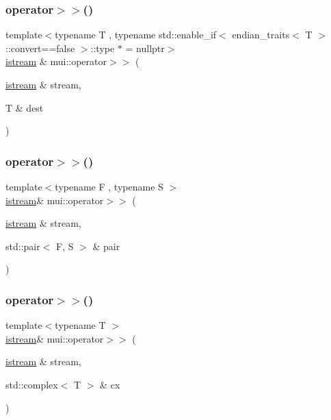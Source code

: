 \mbox{\label{namespacemui_a3b115b75378c546838f2622c86ebb53c}} 
\subsubsection{\texorpdfstring{operator$>$$>$()}{operator>>()}\hspace{0.1cm}{\footnotesize\ttfamily [16/20]}}
{\footnotesize\ttfamily template$<$typename T , typename std\+::enable\+\_\+if$<$ endian\+\_\+traits$<$ T $>$\+::convert==false $>$\+::type $\ast$  = nullptr$>$ \\
\hyperlink{classmui_1_1istream}{istream} \& mui\+::operator$>$$>$ (\begin{DoxyParamCaption}\item[{\hyperlink{classmui_1_1istream}{istream} \&}]{stream,  }\item[{T \&}]{dest }\end{DoxyParamCaption})}

\mbox{\label{namespacemui_a276a62a23127d6c7fbfd6525bca21d22}} 
\subsubsection{\texorpdfstring{operator$>$$>$()}{operator>>()}\hspace{0.1cm}{\footnotesize\ttfamily [17/20]}}
{\footnotesize\ttfamily template$<$typename F , typename S $>$ \\
\hyperlink{classmui_1_1istream}{istream}\& mui\+::operator$>$$>$ (\begin{DoxyParamCaption}\item[{\hyperlink{classmui_1_1istream}{istream} \&}]{stream,  }\item[{std\+::pair$<$ F, S $>$ \&}]{pair }\end{DoxyParamCaption})}

\mbox{\label{namespacemui_a95e511efccb2493b9ac59fe7fc2ff7d4}} 
\subsubsection{\texorpdfstring{operator$>$$>$()}{operator>>()}\hspace{0.1cm}{\footnotesize\ttfamily [18/20]}}
{\footnotesize\ttfamily template$<$typename T $>$ \\
\hyperlink{classmui_1_1istream}{istream}\& mui\+::operator$>$$>$ (\begin{DoxyParamCaption}\item[{\hyperlink{classmui_1_1istream}{istream} \&}]{stream,  }\item[{std\+::complex$<$ T $>$ \&}]{cx }\end{DoxyParamCaption})}

